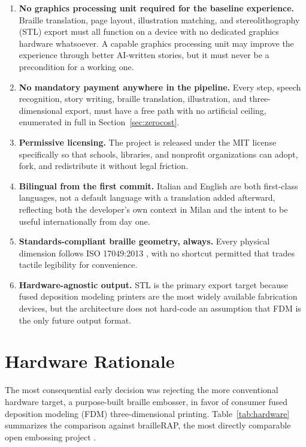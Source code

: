 \documentclass[conference]{IEEEtran}
\begin{document}
\begin{enumerate}
\item \textbf{No graphics processing unit required for the baseline experience.} Braille translation, page layout, illustration matching, and stereolithography (STL) export must all function on a device with no dedicated graphics hardware whatsoever. A capable graphics processing unit may improve the experience through better AI-written stories, but it must never be a precondition for a working one.
\item \textbf{No mandatory payment anywhere in the pipeline.} Every step, speech recognition, story writing, braille translation, illustration, and three-dimensional export, must have a free path with no artificial ceiling, enumerated in full in Section~\ref{sec:zerocost}.
\item \textbf{Permissive licensing.} The project is released under the MIT license specifically so that schools, libraries, and nonprofit organizations can adopt, fork, and redistribute it without legal friction.
\item \textbf{Bilingual from the first commit.} Italian and English are both first-class languages, not a default language with a translation added afterward, reflecting both the developer's own context in Milan and the intent to be useful internationally from day one.
\item \textbf{Standards-compliant braille geometry, always.} Every physical dimension follows ISO 17049:2013 \cite{iso17049}, with no shortcut permitted that trades tactile legibility for convenience.
\item \textbf{Hardware-agnostic output.} STL is the primary export target because fused deposition modeling printers are the most widely available fabrication devices, but the architecture does not hard-code an assumption that FDM is the only future output format.
\end{enumerate}

\section{Hardware Rationale}\label{sec:hardware}

The most consequential early decision was rejecting the more conventional hardware target, a purpose-built braille embosser, in favor of consumer fused deposition modeling (FDM) three-dimensional printing. Table~\ref{tab:hardware} summarizes the comparison against brailleRAP, the most directly comparable open embossing project \cite{braillerap}.
\end{document}
